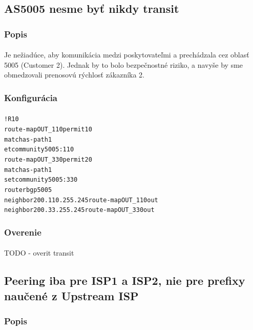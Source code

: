 \documentclass[12pt,twoside,a4paper]{report}
\begin{document}
\subsection{AS5005 nesme byť nikdy transit}
\subsubsection{Popis}
\paragraph{}
Je nežiadúce, aby komunikácia medzi poskytovateľmi  a  prechádzala cez oblasť 5005 (Customer 2). Jednak by to bolo bezpečnostné riziko, a navyše by sme obmedzovali prenosovú rýchlosť zákazníka 2.

\subsubsection{Konfigurácia}
\paragraph{}

\noindent
{\selectfont
\begin{small}
\begin{alltt}
!R10
route-map OUT_110 permit 10
  match as-path 1
  et community 5005:110
route-map OUT_330 permit 20
  match as-path 1
  set community 5005:330
router bgp 5005
  neighbor 200.110.255.245 route-map OUT_110 out
  neighbor 200.33.255.245 route-map OUT_330 out

\end{alltt}
\end{small}
}

\subsubsection{Overenie}
\paragraph{}
TODO - overit transit






\subsection{Peering iba pre ISP1 a ISP2, nie pre prefixy naučené z Upstream ISP}
\subsubsection{Popis}
\end{document}
